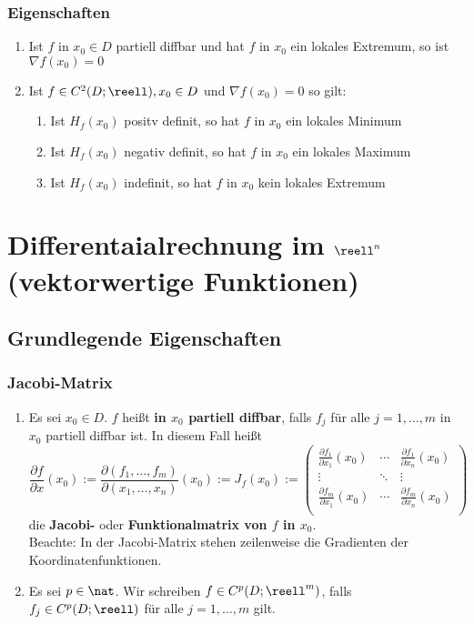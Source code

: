 \documentclass{kit}
\begin{document}
    \subsubsection{Eigenschaften}
      \begin{enumerate}
        \item Ist $f$ in $x_0\in D$ partiell diffbar und hat $f$ in $x_0$ ein lokales Extremum, so ist $\nabla f(x_0)=0$
        \item Ist $f\in C^2(D;\reell),x_0\in D$ und $\nabla f(x_0)=0$ so gilt:
          \begin{enumerate}[label=\roman*)]
            \item Ist $H_f(x_0)$ positv definit, so hat $f$ in $x_0$ ein lokales Minimum
            \item Ist $H_f(x_0)$ negativ definit, so hat $f$ in $x_0$ ein lokales Maximum
            \item Ist $H_f(x_0)$ indefinit, so hat $f$ in $x_0$ kein lokales Extremum 
          \end{enumerate}
      \end{enumerate}
\section{Differentaialrechnung im \texorpdfstring{$\reell^n$}{}\footnotesize{(vektorwertige Funktionen)}}
  \subsection{Grundlegende Eigenschaften}
    \subsubsection{Jacobi-Matrix}
      \begin{enumerate}
        \item Es sei $x_0\in D$. $f$ heißt \textbf{in $x_0$ partiell diffbar}, falls $f_j$ für alle $j=1,\dots,m$ in $x_0$
          partiell diffbar ist. In diesem Fall heißt
          $$\frac{\partial f}{\partial x}(x_0):=\frac{\partial(f_1,\dots,f_m)}{\partial(x_1,\dots,x_n)}(x_0)
          :=J_f(x_0):=\begin{pmatrix}
            \frac{\partial f_1}{\partial x_1}(x_0) & \cdots & \frac{\partial f_1}{\partial x_n}(x_0)\\
            \vdots & \ddots & \vdots\\
            \frac{\partial f_m}{\partial x_1}(x_0) & \cdots & \frac{\partial f_m}{\partial x_n}(x_0)\\
          \end{pmatrix}$$
          die \textbf{Jacobi-} oder \textbf{Funktionalmatrix von $f$ in $x_0$}.\\
          Beachte: In der Jacobi-Matrix stehen zeilenweise die Gradienten der Koordinatenfunktionen.
        \item Es sei $p\in\nat$. Wir schreiben $f\in C^p(D;\reell^m)$, falls $f_j\in C^p(D;\reell)$ für alle $j=1,\dots,m$
          gilt.
      \end{enumerate}
\end{document}
